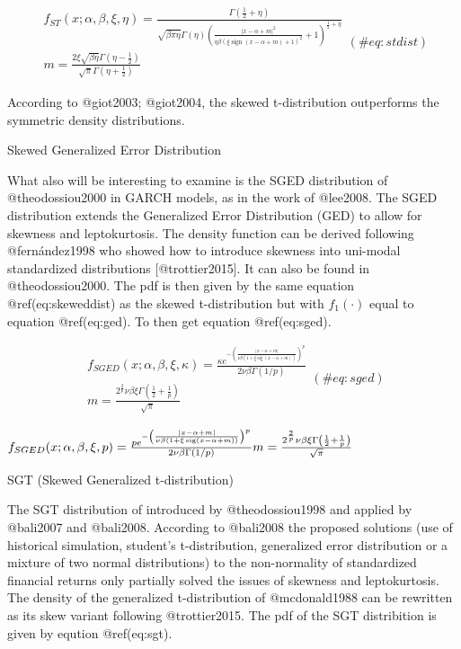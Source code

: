 \documentclass[
]{article}
\begin{document}
\begin{equation}
\begin{array}{c}f_{S T}(x ; \alpha, \beta, \xi, \eta)=\frac{\Gamma\left(\frac{1}{2}+\eta\right)}{\sqrt{\beta\pi \eta} \Gamma(\eta)\left(\frac{|x-\alpha+m|^{2}}{\eta\beta(\xi \operatorname{sign}(x-\alpha+m)+1)^{2}}+1\right)^{\frac{1}{2}+\eta}} \\m=\frac{2 \xi \sqrt{\beta\eta} \Gamma\left(\eta-\frac{1}{2}\right)}{\sqrt{\pi} \Gamma\left(\eta+\frac{1}{2}\right)}\end{array}
 (\#eq:stdist)
\end{equation}

\noindent According to @giot2003; @giot2004, the skewed t-distribution
outperforms the symmetric density distributions.

Skewed Generalized Error Distribution

\noindent What also will be interesting to examine is the SGED
distribution of @theodossiou2000 in GARCH models, as in the work of
@lee2008. The SGED distribution extends the Generalized Error
Distribution (GED) to allow for skewness and leptokurtosis. The density
function can be derived following @fernández1998 who showed how to
introduce skewness into uni-modal standardized distributions
{[}@trottier2015{]}. It can also be found in @theodossiou2000. The pdf
is then given by the same equation @ref(eq:skeweddist) as the skewed
t-distribution but with \(f_1(\cdot)\) equal to equation @ref(eq:ged).
To then get equation @ref(eq:sged).

\begin{equation}
\begin{array}{c}
f_{S G E D}(x ; \alpha, \beta, \xi, \kappa)=\frac{\kappa e^{-\left(\frac{|x-\alpha+m|}{\nu \beta(1+\xi \operatorname{sig}(x-\alpha+m))}\right)^{p}}}{2 \nu \beta \Gamma(1 / p)} \\
m=\frac{2^{\frac{2}{p}} \nu \beta \xi \Gamma\left(\frac{1}{2}+\frac{1}{p}\right)}{\sqrt{\pi}}
\end{array}
(\#eq:sged)
\end{equation}

\(f_{S G E D}(x ; \alpha, \beta, \xi, p)=\frac{p e^{-\left(\frac{|x-\alpha+m|}{\nu \beta(1+\xi \operatorname{sig}(x-\alpha+m))}\right)^{p}}}{2 \nu \beta \Gamma(1 / p)} \\m=\frac{2^{\frac{2}{p}} \nu \beta \xi \Gamma\left(\frac{1}{2}+\frac{1}{p}\right)}{\sqrt{\pi}}\)

SGT (Skewed Generalized t-distribution)

\noindent The SGT distribution of introduced by @theodossiou1998 and
applied by @bali2007 and @bali2008. According to @bali2008 the proposed
solutions (use of historical simulation, student's t-distribution,
generalized error distribution or a mixture of two normal distributions)
to the non-normality of standardized financial returns only partially
solved the issues of skewness and leptokurtosis. The density of the
generalized t-distribution of @mcdonald1988 can be rewritten as its skew
variant following @trottier2015. The pdf of the SGT distribition is
given by eqution @ref(eq:sgt).
\end{document}

